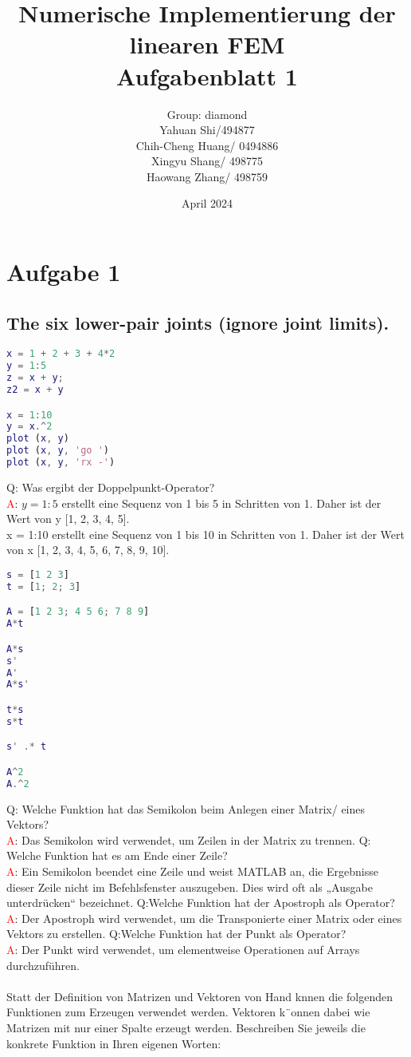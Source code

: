 \documentclass{article}
\title{Numerische Implementierung der linearen FEM\\Aufgabenblatt 1}
\author{Group: diamond\\
        Yahuan Shi/494877\\
        Chih-Cheng Huang/ 0494886\\
        Xingyu Shang/ 498775\\
        Haowang Zhang/ 498759\\ 
       }
\date{April 2024}
\begin{document}
\maketitle



\section{Aufgabe 1}
\subsection{The six lower-pair joints (ignore joint limits).}

\begin{lstlisting}[language=Matlab]
x = 1 + 2 + 3 + 4*2
y = 1:5
z = x + y;
z2 = x + y

x = 1:10
y = x.^2
plot (x, y)
plot (x, y, 'go ')
plot (x, y, 'rx -')
\end{lstlisting}
Q: Was ergibt der Doppelpunkt-Operator?\\
\textcolor{red}{A}: $y=1:5$  erstellt eine Sequenz von 1 bis 5 in Schritten von 1. Daher ist der Wert von y [1, 2, 3, 4, 5].\\
x = 1:10 erstellt eine Sequenz von 1 bis 10 in Schritten von 1. Daher ist der Wert von x [1, 2, 3, 4, 5, 6, 7, 8, 9, 10].\\

\begin{lstlisting}[language=Matlab]
s = [1 2 3]
t = [1; 2; 3]

A = [1 2 3; 4 5 6; 7 8 9]
A*t

A*s
s'
A'
A*s'

t*s
s*t

s' .* t

A^2
A.^2
\end{lstlisting}
Q: Welche Funktion hat das Semikolon beim Anlegen einer Matrix/ eines Vektors?\\
\textcolor{red}{A}: Das Semikolon wird verwendet, um Zeilen in der Matrix zu trennen. 
Q: Welche Funktion hat es am Ende einer Zeile?\\
\textcolor{red}{A}: Ein Semikolon beendet eine Zeile und weist MATLAB an, die Ergebnisse dieser Zeile nicht im Befehlsfenster auszugeben. Dies wird oft als „Ausgabe unterdrücken“ bezeichnet.
Q:Welche Funktion hat der Apostroph als Operator?\\
\textcolor{red}{A}: Der Apostroph wird verwendet, um die Transponierte einer Matrix oder eines Vektors zu erstellen. 
Q:Welche Funktion hat der Punkt als Operator?\\
\textcolor{red}{A}: Der Punkt wird verwendet, um elementweise Operationen auf Arrays durchzuführen. \\\\
Statt der Definition von Matrizen und Vektoren von Hand knnen die folgenden Funktionen zum Erzeugen verwendet werden. Vektoren k¨onnen dabei wie Matrizen mit nur einer Spalte erzeugt werden. Beschreiben Sie jeweils die konkrete Funktion in Ihren eigenen Worten:\\
\end{document}
